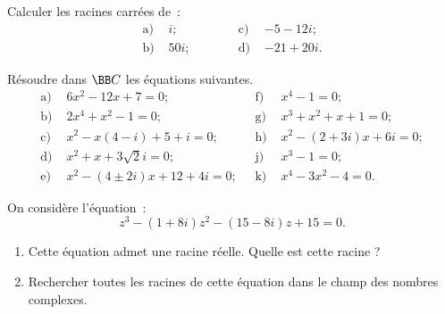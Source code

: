 \documentclass[12pt,french,oneside,a4paper]{memoir} %
\begin{document}
\begin{exo}
Calculer les racines carrées de~:
\begin{equation*}
\begin{array}{llll}
\mbox{a) } &i; \qquad \qquad &\mbox{c) } &-5-12i; \\
\mbox{b) } &50i; &\mbox{d) } &-21+20i. 
\end{array}
\end{equation*}
\end{exo}

\begin{exo}
Résoudre dans ${\BB C}$ les équations suivantes.
\begin{equation*}
\begin{array}{llrl}
\mbox{a) } &6x^2-12x+7=0;\qquad \qquad \qquad &\mbox{f) } &x^4-1=0; \\
\mbox{b) } &2x^4+x^2-1=0; &\mbox{g) } &x^3+x^2+x+1=0; \\
\mbox{c) } &x^2-x(4-i)+5+i=0; &\mbox{h) } &x^2-(2+3i)x+6i=0; \\
\mbox{d) } &x^2+x+3 \sqrt{2}i=0; &\mbox{j) } &x^3-1=0; \\
\mbox{e) } &x^2-(4 \pm 2i)x+12+4i=0; &\mbox{k) } &x^4-3x^2-4=0.
\end{array}
\end{equation*}
\end{exo}

\begin{exo}
On considère l'équation~:
\begin{equation*}
z^3-(1+8i)z^2-(15-8i)z+15=0.
\end{equation*}
\begin{enumerate}
\item Cette équation admet une racine réelle. Quelle est cette racine ? 
\item Rechercher toutes les racines de cette équation dans le champ 
des nombres complexes.
\end{enumerate}
\end{exo}
\end{document}
